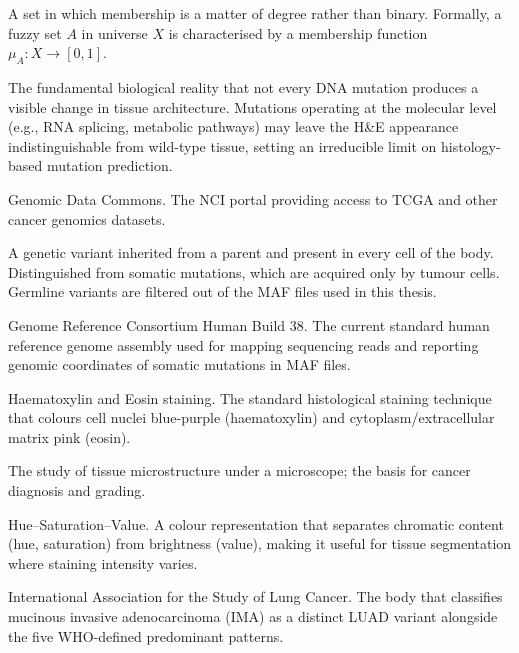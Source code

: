 \begin{description}[style=nextline,leftmargin=4cm]
\item[Fuzzy set] A set in which membership is a matter of degree rather than binary.  Formally, a fuzzy set $A$ in universe $X$ is characterised by a membership function $\mu_A: X \to [0,1]$.


\item[Genotype--phenotype gap] The fundamental biological reality that not every DNA mutation produces a visible change in tissue architecture.  Mutations operating at the molecular level (e.g., RNA splicing, metabolic pathways) may leave the H\&E appearance indistinguishable from wild-type tissue, setting an irreducible limit on histology-based mutation prediction.

\item[GDC] Genomic Data Commons.  The NCI portal providing access to TCGA and other cancer genomics datasets.


\item[Germline mutation] A genetic variant inherited from a parent and present in every cell of the body.  Distinguished from somatic mutations, which are acquired only by tumour cells.  Germline variants are filtered out of the MAF files used in this thesis.


\item[GRCh38] Genome Reference Consortium Human Build 38.  The current standard human reference genome assembly used for mapping sequencing reads and reporting genomic coordinates of somatic mutations in MAF files.


\item[H\&E staining] Haematoxylin and Eosin staining.  The standard histological staining technique that colours cell nuclei blue-purple (haematoxylin) and cytoplasm/extracellular matrix pink (eosin).


\item[Histology] The study of tissue microstructure under a microscope; the basis for cancer diagnosis and grading.


\item[HSV colour space] Hue--Saturation--Value.  A colour representation that separates chromatic content (hue, saturation) from brightness (value), making it useful for tissue segmentation where staining intensity varies.


\item[IASLC] International Association for the Study of Lung Cancer.  The body that classifies mucinous invasive adenocarcinoma (IMA) as a distinct LUAD variant alongside the five WHO-defined predominant patterns.



\end{description}

